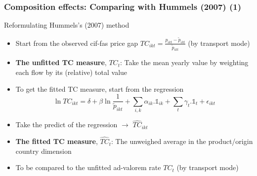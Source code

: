 \documentclass[10 pt,Helvetica, french]{beamer}
\begin{document}
\begin{frame}[label = app_compeffects_Hummels]
\frametitle{Composition effects: Comparing with Hummels (2007) (1)}
Reformulating Hummels's (2007) method  \vspace{0.1cm}
\begin{itemize}
\item Start from the observed cif-fas price gap $TC_{ikt} = \frac{p_{ikt} - \widetilde{p}_{ikt}}{\widetilde{p}_{ikt}}$ (by transport mode) \vspace{0.1cm}
\item \textbf{The unfitted TC measure}, $TC_t$: Take the mean yearly value by weighting each flow by its (relative) total value \vspace{0.1cm}
\item To get the fitted TC measure, start from the regression \vspace{0.1cm}
\footnotesize
\begin{equation}
\ln TC_{ikt} = \delta+ \beta \ln \frac{1}{\widetilde{p}_{ikt}} + \sum_{i,k}\alpha_{ik}.\mathbb{1}_{ik}+ \sum_{t}\gamma_{t}.\mathbb{1}_{t} + \epsilon_{ikt}
\label{eq:hummels}\end{equation}
\normalsize
\item Take the predict of the regression $\rightarrow$ $\widehat{TC}_{ikt}$   \vspace{0.1cm}
\item \textbf{The fitted TC measure}, $\widehat{TC}_t$: The unweighed average in the product/origin country dimension   \vspace{0.1cm}
\item To be compared to the unfitted ad-valorem rate $TC_t$ (by transport mode)

\end{itemize}


\end{frame}
\end{document}
